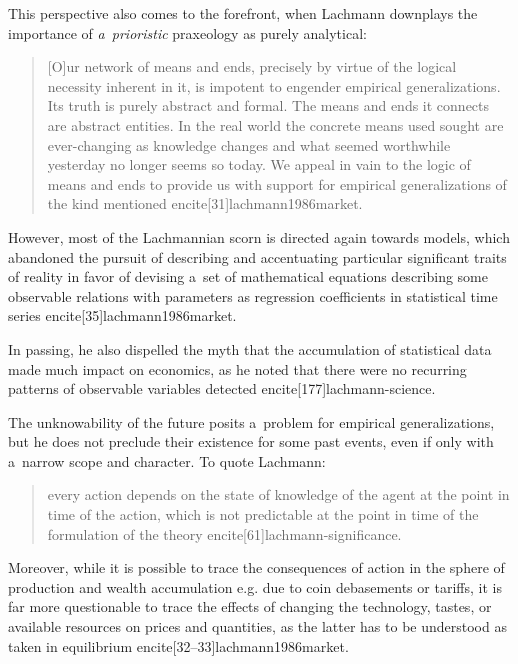 {This perspective also comes to the forefront, when Lachmann downplays the importance of \emph{a~prioristic} praxeology as purely analytical:

\begin{quote}

[O]ur network of means and ends, precisely by virtue of the logical necessity inherent in it, is impotent to engender empirical generalizations. Its truth is purely abstract and formal. The means and ends it connects are abstract entities. In the real world the concrete means used sought are ever-changing as knowledge changes and what seemed worthwhile yesterday no longer seems so today. We appeal in vain to the logic of means and ends to provide us with support for empirical generalizations of the kind mentioned encite[31]{lachmann1986market}.

\end{quote}



However, most of the Lachmannian scorn is directed again towards models, which abandoned the pursuit of describing and accentuating particular significant traits of reality in favor of devising a~set of mathematical equations describing some observable relations with parameters as regression coefficients in statistical time series encite[35]{lachmann1986market}.

In passing, he also dispelled the myth that the accumulation of statistical data made much impact on economics, as he noted that there were no recurring patterns of observable variables detected encite[177]{lachmann-science}.



The unknowability of the future posits a~problem for empirical generalizations, but he does not preclude their existence for some past events, even if only with a~narrow scope and character. To quote Lachmann:

\begin{quote}

every action depends on the state of knowledge of the agent at the point in time of the action, which is not predictable at the point in time of the formulation of the theory encite[61]{lachmann-significance}.

\end{quote}

Moreover, while it is possible to trace the consequences of action in the sphere of production and wealth accumulation e.g. due to coin debasements or tariffs, it is far more questionable to trace the effects of changing the technology, tastes, or available resources on prices and quantities, as the latter has to be understood as taken in equilibrium encite[32--33]{lachmann1986market}.



}
